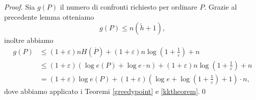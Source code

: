 \begin{proof}
	Sia \(g(P)\) il numero di confronti richiesto per ordinare \(P\). Grazie al precedente lemma otteniamo
	\[g(P)\le n(\tilde{h}+1),\]
	inoltre abbiamo 
	\begin{align}
		g(P)&\le (1+\varepsilon)nH(\overline{P})+(1+\varepsilon)n\log{\left(1+\frac{1}{\varepsilon}\right)}+n \nonumber \\
		&\le (1+\varepsilon)(\log{e(P)+\log{e\cdot n}})+(1+\varepsilon)n\log{\left(1+\frac{1}{\varepsilon}\right)}+n \nonumber \\
		&=(1+\varepsilon)\log{e(P)}+(1+\varepsilon)\left(\log{e}+\log{\left(1+\frac{1}{\varepsilon}\right)}+1\right)\cdot n, \nonumber 
	\end{align}
	dove abbiamo applicato i Teoremi \ref{greedypoint} e \ref{kktheorem}.\qed 
\end{proof}

